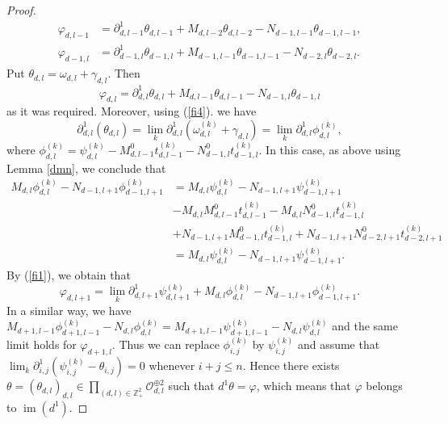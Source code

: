\documentclass[12pt,reqno]{amsart}%
\theoremstyle{plain}
\numberwithin{theorem}{section} \numberwithin{equation}{section}
\numberwithin{lemma}{section}
\numberwithin{remark}{section}
\numberwithin{example}{section}
\numberwithin{proposition}{section}
\numberwithin{definition}{section}
\numberwithin{corollary}{section}
\begin{document}
\begin{proof}
\begin{align*}
\varphi_{d,l-1}  &  =\partial_{d,l-1}^{1}\theta_{d,l-1}+M_{d,l-2}%
\theta_{d,l-2}-N_{d-1,l-1}\theta_{d-1,l-1},\\
\varphi_{d-1,l}  &  =\partial_{d-1,l}^{1}\theta_{d-1,l}+M_{d-1,l-1}%
\theta_{d-1,l-1}-N_{d-2,l}\theta_{d-2,l}.
\end{align*}
Put $\theta_{d,l}=\omega_{d,l}+\gamma_{d,l}$. Then%
\[
\varphi_{d,l}=\partial_{d,l}^{1}\theta_{d,l}+M_{d,l-1}\theta_{d,l-1}%
-N_{d-1,l}\theta_{d-1,l}%
\]
as it was required. Moreover, using (\ref{fi4}). we have
\[
\partial_{d,l}^{1}\left(  \theta_{d,l}\right)  =\lim_{k}\partial_{d,l}%
^{1}\left(  \omega_{d,l}^{\left(  k\right)  }+\gamma_{d,l}\right)  =\lim
_{k}\partial_{d,l}^{1}\phi_{d,l}^{\left(  k\right)  },
\]
where $\phi_{d,l}^{\left(  k\right)  }=\psi_{d,l}^{\left(  k\right)
}-M_{d,l-1}^{0}t_{d,l-1}^{\left(  k\right)  }-N_{d-1,l}^{0}t_{d-1,l}^{\left(
k\right)  }$. In this case, as above using Lemma \ref{dmn}, we conclude that
\begin{align*}
M_{d,l}\phi_{d,l}^{\left(  k\right)  }-N_{d-1,l+1}\phi_{d-1,l+1}^{\left(
k\right)  }  &  =M_{d,l}\psi_{d,l}^{\left(  k\right)  }-N_{d-1,l+1}%
\psi_{d-1,l+1}^{\left(  k\right)  }\\
&  -M_{d,l}M_{d,l-1}^{0}t_{d,l-1}^{\left(  k\right)  }-M_{d,l}N_{d-1,l}%
^{0}t_{d-1,l}^{\left(  k\right)  }\\
&  +N_{d-1,l+1}M_{d-1,l}^{0}t_{d-1,l}^{\left(  k\right)  }+N_{d-1,l+1}%
N_{d-2,l+1}^{0}t_{d-2,l+1}^{\left(  k\right)  }\\
&  =M_{d,l}\psi_{d,l}^{\left(  k\right)  }-N_{d-1,l+1}\psi_{d-1,l+1}^{\left(
k\right)  }.
\end{align*}
By (\ref{fi1}), we obtain that
\[
\varphi_{d,l+1}=\lim_{k}\partial_{d,l+1}^{1}\psi_{d,l+1}^{\left(  k\right)
}+M_{d,l}\phi_{d,l}^{\left(  k\right)  }-N_{d-1,l+1}\phi_{d-1,l+1}^{\left(
k\right)  }.
\]
In a similar way, we have $M_{d+1,l-1}\phi_{d+1,l-1}^{\left(  k\right)
}-N_{d,l}\phi_{d,l}^{\left(  k\right)  }=M_{d+1,l-1}\psi_{d+1,l-1}^{\left(
k\right)  }-N_{d,l}\psi_{d,l}^{\left(  k\right)  }$ and the same limit holds
for $\varphi_{d+1,l}$. Thus we can replace $\phi_{i,j}^{\left(  k\right)  }$
by $\psi_{i,j}^{\left(  k\right)  }$ and assume that $\lim_{k}\partial
_{i,j}^{1}\left(  \psi_{i,j}^{\left(  k\right)  }-\theta_{i,j}\right)  =0$
whenever $i+j\leq n$. Hence there exists $\theta=\left(  \theta_{d,l}\right)
_{d,l}\in\prod\limits_{\left(  d,l\right)  \in\mathbb{Z}_{+}^{2}}%
\mathcal{O}_{d,l}^{\oplus2}$ such that $d^{1}\theta=\varphi$, which means that
$\varphi$ belongs to $\operatorname{im}\left(  d^{1}\right)  $.
\end{proof}
\end{document}
